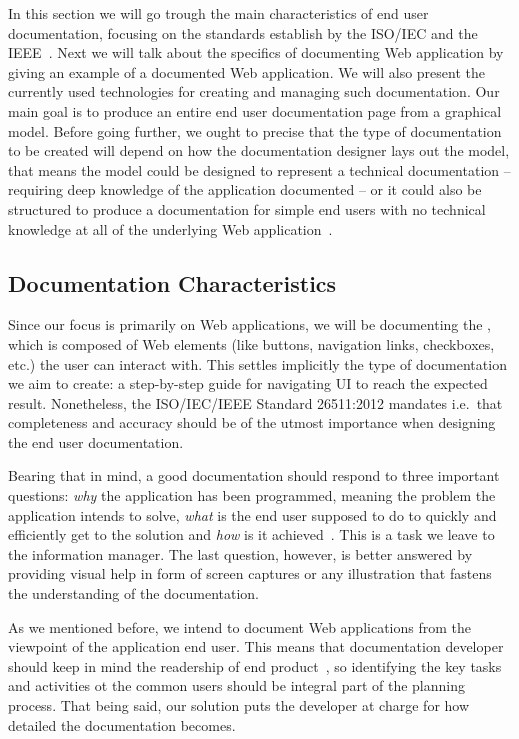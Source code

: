 In this section we will go trough the main characteristics of end user documentation, focusing on the standards establish by the ISO/IEC and the IEEE~\cite{ieee5712775, ISO-IEC-IEEE}. Next we will talk about the specifics of documenting Web application by giving an example of a documented Web application. We will also present the currently used technologies for creating and managing such documentation. Our main goal is to produce an entire end user documentation page from a graphical model. Before going further, we ought to precise that the type of documentation to be created will depend on how the documentation designer lays out the model, that means the model could be designed to represent a technical documentation -- requiring deep knowledge of the application documented -- or it could also be structured to produce a documentation for simple end users with no technical knowledge at all of the underlying Web application~\cite{ieee6081814}.


\subsection{Documentation Characteristics}\label{sec:char}

Since our focus is primarily on Web applications, we will be documenting the , which is composed of Web elements (like buttons, navigation links, checkboxes, etc.) the user can interact with. This settles implicitly the type of documentation we aim to create: a step-by-step guide for navigating UI to reach the expected result. Nonetheless, the ISO/IEC/IEEE Standard 26511:2012 mandates i.e.~that completeness and accuracy should be of the utmost importance when designing the end user documentation.

Bearing that in mind, a good documentation should respond to three important questions: \textit{why} the application has been programmed, meaning the problem the application intends to solve, \textit{what} is the end user supposed to do to quickly and efficiently get to the solution and \textit{how} is it achieved~\cite{ISO-IEC-IEEE}. This is a task we leave to the information manager. The last question, however, is better answered by providing visual help in form of screen captures or any illustration that fastens the understanding of the documentation. 

As we mentioned before, we intend to document Web applications from the viewpoint of the application end user. This means that documentation developer should keep in mind the readership of end product~\cite{ISO-IEC-IEEE}, so identifying the key tasks and activities ot the common users should be integral part of the planning process. That being said, our solution puts the developer at charge for how detailed the documentation becomes.

